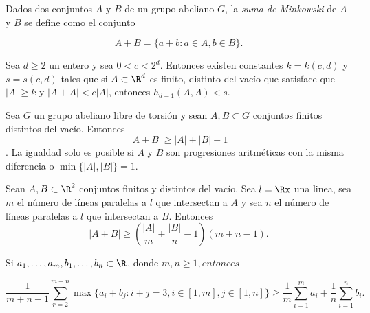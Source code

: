Dados dos conjuntos $A$ y $B$ de un grupo abeliano $G$, la \textit{suma de Minkowski} de $A$ y $B$ se define como el conjunto 

$$ A + B = \{a + b: a \in A, b \in B\}.$$

\begin{teo}
	Sea $d \geq 2$ un entero y sea $0 < c < 2^d.$ Entonces existen constantes $k = k(c,d)$ y $s = s(c, d)$ tales que si $A \subset \R^d$ es finito, distinto del vacío que satisface que $\lvert A \rvert \geq k$ y $\lvert A + A \rvert < c \lvert A \rvert$, entonces $h_{d-1}(A, A) < s.$ 
\end{teo} %

\begin{teo}
	Sea $G$ un grupo abeliano libre de torsión y sean $A, B \subset G$ conjuntos finitos distintos del vacío. Entonces
	$$ \lvert A + B \rvert \geq \lvert A \rvert + \lvert B \rvert - 1$$. 
	La igualdad solo es posible si $A$ y $B$ son progresiones aritméticas con la misma diferencia o $\min\{\lvert A \rvert, \lvert B \rvert \} = 1.$
\end{teo} %


\begin{teo}
	Sean $A, B \subset \R^2$ conjuntos finitos y distintos del vacío. Sea $l = \Rx$ una linea, sea $m$ el número de líneas paralelas a $l$ que intersectan a $A$ y sea $n$ el número de líneas paralelas a $l$ que intersectan a $B$. Entonces
	$$ \lvert A + B \rvert \geq \left( \frac{\lvert A \rvert}{m} + \frac{\lvert B \rvert}{n} - 1 \right)(m+n-1).$$
	
\end{teo} %

\begin{lema}
	Si $a_1, \ldots, a_m, b_1, \ldots, b_n \subset \R$, donde $m, n \geq 1, entonces$

	$$\frac{1}{m+n-1}\sum_{r=2}^{m+n}\max\{a_i + b_j: i + j = 3, i \in [1, m], j \in [1,n]\}\geq \frac{1}{m}\sum_{i=1}^m a_i + \frac{1}{n}\sum_{i=1}^n b_i. $$
\end{lema}